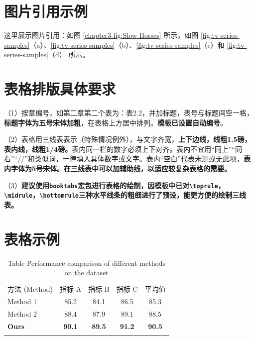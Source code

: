 \documentclass[]{WTUthesis}
\renewcommand{\toprule}{\noalign{\vskip2pt}\specialrule{1.5pt}{0pt}{0pt}\noalign{\vskip2pt}}
\renewcommand{\midrule}{\noalign{\vskip2pt}\specialrule{0.25pt}{0pt}{0pt}\noalign{\vskip2pt}}
\renewcommand{\bottomrule}{\noalign{\vskip2pt}\specialrule{1.5pt}{0pt}{0pt}\noalign{\vskip2pt}}
\begin{document}
\section{图片引用示例}
这里展示图片引用：如图 \ref{chapter3-fig:Slow-Horses} 所示，如图 \ref{fig:tv-series-samples}（a）、\ref{fig:tv-series-samples}（b）、\ref{fig:tv-series-samples}（c）和 \ref{fig:tv-series-samples}（d） 所示。

\clearpage
\section{表格排版具体要求}
（1）按章编号，如第二章第二个表为：表2.2，并加标题，表号与标题间空一格，\textbf{标题字体为五号宋体加粗}，在表格上方居中排列。\textbf{模板已设置自动编号}。

（2）表格用三线表表示（特殊情况例外），与文字齐宽，\textbf{上下边线，线粗1.5磅，表内线，线粗1/4磅。}表内同一栏的数字必须上下对齐。表内不宜用“同上”“同右”“//”和类似词，一律填入具体数字或文字。表内“空白”代表未测或无此项，\textbf{表内字体为5号宋体。在三线表中可以加辅助线，以适应较复杂表格的需要。}

（3）\textbf{建议使用\texttt{booktabs}宏包进行表格的绘制，因模板中已对\texttt{\textbackslash toprule}，\texttt{\textbackslash midrule}，\texttt{\textbackslash bottomrule}三种水平线条的粗细进行了预设，能更方便的绘制三线表。}

\section{表格示例}
\begin{table}[h]
    \centering
    \songti
    \caption{不同方法在数据集上的性能对比}
    \caption*{{Table \thetable} Performance comparison of different methods on the dataset}
    \label{tab:example-data}
    
    \begin{tabular}{l|ccc|c}
    \toprule
    方法 (Method) & 指标 A & 指标 B & 指标 C & 平均值 \\
    \midrule
    Method 1     & 85.2   & 84.1   & 86.5   & 85.3 \\
    Method 2     & 88.4   & 87.9   & 89.1   & 88.5 \\
    \textbf{Ours} & \textbf{90.1} & \textbf{89.5} & \textbf{91.2} & \textbf{90.5} \\
    \bottomrule
    \end{tabular}
\end{table}
\end{document}
